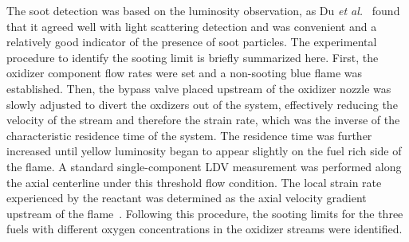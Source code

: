 \documentclass[review,3p,times]{elsarticleUS}
\begin{document}
\begin{table}
  \caption{Oxidizer stream composition in mole fractions.}
  \label{table:exp_condition}
  \centering
\end{table}

The soot detection was based on the luminosity observation, as Du \emph{et al.}~\cite{du89} found that it agreed well with light scattering detection and was convenient and a relatively good indicator of the presence of soot particles. The experimental procedure to identify the sooting limit is briefly summarized here. First, the oxidizer component flow rates were set and a non-sooting blue flame was established. Then, the bypass valve placed upstream of the oxidizer nozzle was slowly adjusted to divert the oxdizers out of the system, effectively reducing the velocity of the stream and therefore the strain rate, which was the inverse of the characteristic residence time of the system. The residence time was further increased until yellow luminosity began to appear slightly on the fuel rich side of the flame. A standard single-component LDV measurement was performed along the axial centerline under this threshold flow condition. The local strain rate experienced by the reactant was determined as the axial velocity gradient upstream of the flame~\cite{du89}. Following this procedure, the sooting limits for the three fuels with different oxygen concentrations in the oxidizer streams were identified.
\end{document}
